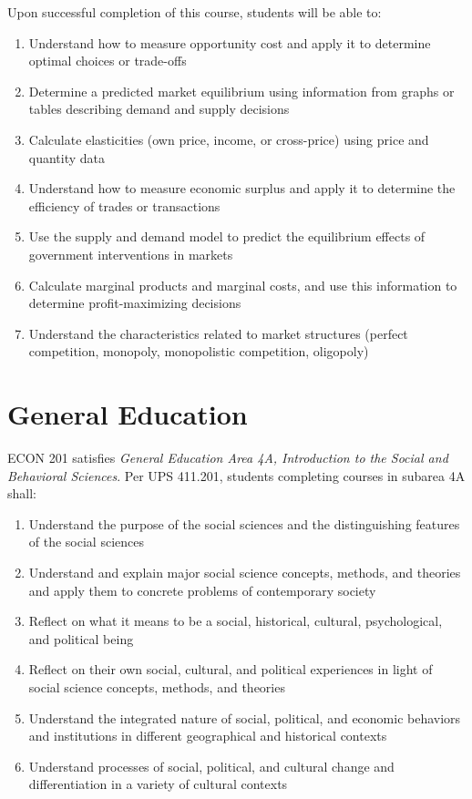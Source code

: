 \documentclass{syllabus}
\begin{document}
Upon successful completion of this course, students will be able to:
\begin{enumerate}
\itemsep0em
\item Understand how to measure opportunity cost and apply it to determine optimal choices or trade-offs
\item Determine a predicted market equilibrium using information from graphs or tables describing demand and supply decisions
\item Calculate elasticities (own price, income, or cross-price) using price and quantity data
\item Understand how to measure economic surplus and apply it to determine the efficiency of trades or transactions
\item Use the supply and demand model to predict the equilibrium effects of government interventions in markets
\item Calculate marginal products and marginal costs, and use this information to determine profit-maximizing decisions
\item Understand the characteristics related to market structures (perfect competition, monopoly, monopolistic competition, oligopoly)
\end{enumerate}



\section*{General Education}

ECON 201 satisfies \textit{General Education Area 4A, Introduction to the Social and Behavioral Sciences}. Per UPS 411.201, students completing courses in subarea 4A shall:
\begin{enumerate}
\itemsep0em
\item Understand the purpose of the social sciences and the distinguishing features of the social sciences
\item Understand and explain major social science concepts, methods, and theories and apply them to concrete problems of contemporary society
\item Reflect on what it means to be a social, historical, cultural, psychological, and political being
\item Reflect on their own social, cultural, and political experiences in light of social science concepts, methods, and theories
\item Understand the integrated nature of social, political, and economic behaviors and institutions in different geographical and historical contexts
\item Understand processes of social, political, and cultural change and differentiation in a variety of cultural contexts
\end{enumerate}
\end{document}
